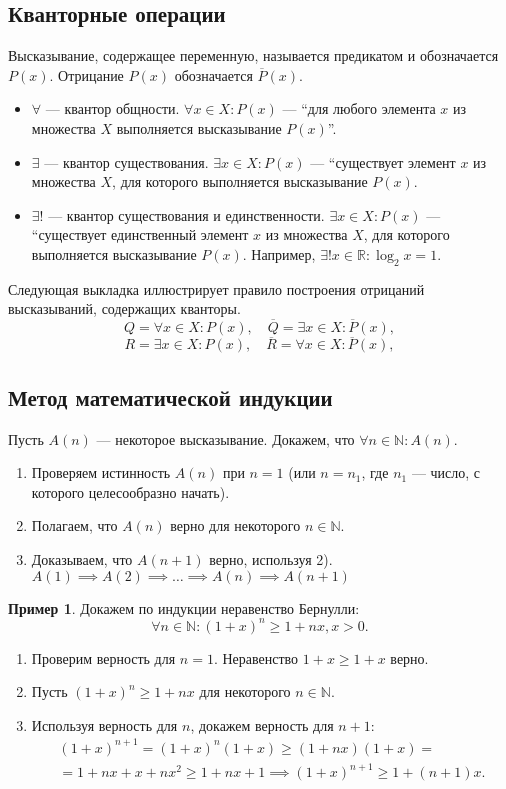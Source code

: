 \documentclass[a4paper,12pt]{article} %
\theoremstyle{remark}
\theoremstyle{definition}
\newtheorem{exmp}{Пример}[section]
\begin{document}
\subsection{Кванторные операции}

Высказывание, содержащее переменную, называется предикатом и обозначается $P(x)$. Отрицание $P(x)$ обозначается $\overline{P}(x)$.

\begin{itemize}
	\item $\forall $ --- квантор общности. $\forall x \in X : P(x)$ --- ``для любого элемента $x$ из множества $X$ выполняется высказывание $P(x)$''.
	\item $\exists $ --- квантор существования. $\exists x \in X : P(x)$ --- ``существует элемент $x$ из множества $X$, для которого выполняется высказывание $P(x)$.
	\item $\exists !$ --- квантор существования и единственности. $\exists x \in X : P(x)$ --- ``существует единственный элемент $x$ из множества $X$, для которого выполняется высказывание $P(x)$. Например, $\exists ! x \in \mathbb{R} : \log_2 x = 1$.
\end{itemize}

Следующая выкладка иллюстрирует правило построения отрицаний высказываний, содержащих кванторы.
\[
Q = \forall x \in X : P(x), \quad \overline{Q} = \exists x \in X : \overline{P}(x)
,\] 
\[
R = \exists x \in X : P(x), \quad \overline{R} = \forall x \in X : \overline{P}(x)
,\] 
\subsection{Метод математической индукции}
Пусть $A(n)$ --- некоторое высказывание. Докажем, что $\forall n\in \mathbb{N} : A(n)$.
\begin{enumerate}
	\item Проверяем истинность $A(n)$ при $n=1$ (или $n=n_1$, где $n_1$ --- число, с которого целесообразно начать).
	\item Полагаем, что $A(n)$ верно для некоторого $n\in \mathbb{N}$.
	\item Доказываем, что $A(n+1)$ верно, используя 2). $A(1) \implies A(2) \implies \ldots \implies A(n) \implies A(n+1)$ 
\end{enumerate}

\begin{exmp}
	Докажем по индукции неравенство Бернулли:
\[
\forall n \in  \mathbb{N} : (1+x)^{n} \ge  1 + nx, x > 0
.\] 
\begin{enumerate}
	\item Проверим верность для $n = 1$. Неравенство $1 + x \ge  1 + x$ верно.
	\item Пусть $(1+x)^{n} \ge  1 + nx$ для некоторого $n \in \mathbb{N}$.
	\item Используя верность для $n$, докажем верность для $n+1$:
		\begin{multline}
		(1+x)^{n+1} = (1+x)^{n}(1+x) \ge (1+nx)(1+x) = \\
		= 1 + nx + x + nx^2 \ge 1 + nx + 1 \implies (1+x)^{n+1} \ge  1 + (n+1)x. 	
		\end{multline}
\end{enumerate}

\end{exmp}
\newpage
\end{document}

